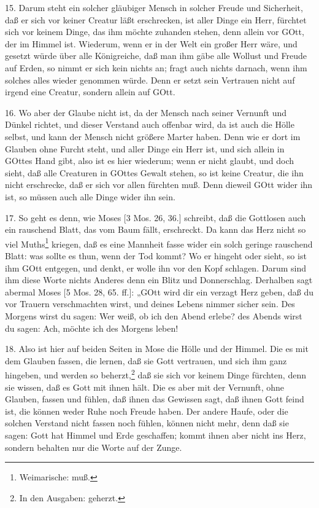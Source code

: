 15. Darum steht ein solcher gläubiger Mensch in solcher Freude und Sicherheit, daß er sich vor keiner Creatur läßt erschrecken, ist aller Dinge ein Herr, fürchtet sich vor keinem Dinge, das ihm möchte zuhanden stehen, denn allein vor GOtt, der im Himmel ist. Wiederum, wenn er in der Welt ein großer Herr wäre, und gesetzt würde über alle Königreiche, daß man ihm gäbe alle Wollust und Freude auf Erden, so nimmt er sich kein nichts an; fragt auch nichts darnach, wenn ihm solches alles wieder genommen würde. Denn er setzt sein Vertrauen nicht auf irgend eine Creatur, sondern allein auf GOtt.

16. Wo aber der Glaube nicht ist, da der Mensch nach seiner Vernunft und Dünkel richtet, und dieser Verstand auch offenbar wird, da ist auch die Hölle selbst, und kann der Mensch nicht größere Marter haben. Denn wie er dort im Glauben ohne Furcht steht, und aller Dinge ein Herr ist, und sich allein in GOttes Hand gibt, also ist es hier wiederum; wenn er nicht glaubt, und doch sieht, daß alle Creaturen in GOttes Gewalt stehen, so ist keine Creatur, die ihn nicht erschrecke, daß er sich vor allen fürchten muß. Denn dieweil GOtt wider ihn ist, so müssen auch alle Dinge wider ihn sein.

17. So geht es denn, wie Moses [3 Mos. 26, 36.] schreibt, daß die Gottlosen auch ein rauschend Blatt, das vom Baum fällt, erschreckt. Da kann das Herz nicht so viel Muths\footnote{Weimarische: muß.} kriegen, daß es eine Mannheit fasse wider ein solch geringe rauschend Blatt: was sollte es thun, wenn der Tod kommt? Wo er hingeht oder sieht, so ist ihm GOtt entgegen, und denkt, er wolle ihn vor den Kopf schlagen. Darum sind ihm diese Worte nichts Anderes denn ein Blitz und Donnerschlag. Derhalben sagt abermal Moses [5 Mos. 28, 65. ff.]: „GOtt wird dir ein verzagt Herz geben, daß du vor Trauern verschmachten wirst, und deines Lebens nimmer sicher sein. Des Morgens wirst du sagen: Wer weiß, ob ich den
Abend erlebe? des Abends wirst du sagen: Ach, möchte ich des Morgens leben!

18. Also ist hier auf beiden Seiten in Mose die Hölle und der Himmel. Die es mit dem Glauben fassen, die lernen, daß sie Gott vertrauen, und sich ihm ganz hingeben, und werden so beherzt,\footnote{In den Ausgaben: geherzt.} daß sie sich vor keinem Dinge fürchten, denn sie wissen, daß es Gott mit ihnen hält. Die es aber mit der Vernunft, ohne Glauben, fassen und fühlen, daß ihnen das Gewissen sagt, daß ihnen Gott feind ist, die können weder Ruhe noch Freude haben. Der andere Haufe, oder die solchen Verstand nicht fassen noch fühlen, können nicht mehr, denn daß sie sagen: Gott hat Himmel und Erde geschaffen; kommt ihnen aber nicht ins Herz, sondern behalten nur die Worte auf der Zunge.

